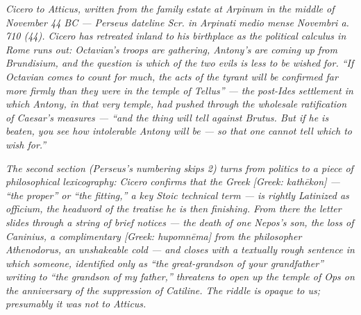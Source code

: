 
\textit{Cicero to Atticus, written from the family estate at
Arpinum in the middle of November 44 BC --- Perseus dateline
\textit{Scr. in Arpinati medio mense Novembri a. 710 (44)}.
Cicero has retreated inland to his birthplace as the political
calculus in Rome runs out: Octavian's troops are gathering,
Antony's are coming up from Brundisium, and the question is
which of the two evils is less to be wished for. ``If Octavian
comes to count for much, the acts of the tyrant will be
confirmed far more firmly than they were in the temple of
Tellus'' --- the post-Ides settlement in which Antony, in that
very temple, had pushed through the wholesale ratification of
Caesar's measures --- ``and the thing will tell against Brutus.
But if he is beaten, you see how intolerable Antony will be ---
so that one cannot tell which to wish for.''}

\textit{The second section (Perseus's numbering skips 2)
turns from politics to a piece of philosophical
lexicography: Cicero confirms that the Greek
\textit{[Greek: kathēkon]} --- ``the proper'' or ``the
fitting,'' a key Stoic technical term --- is rightly Latinized
as \textit{officium}, the headword of the treatise he is then
finishing. From there the letter slides through a string of
brief notices --- the death of one Nepos's son, the loss of
Caninius, a complimentary \textit{[Greek: hupomnēma]} from the
philosopher Athenodorus, an unshakeable cold --- and closes with
a textually rough sentence in which someone, identified only as
``the great-grandson of your grandfather'' writing to ``the
grandson of my father,'' threatens to open up the temple of Ops
on the anniversary of the suppression of Catiline. The riddle
is opaque to us; presumably it was not to Atticus.}
